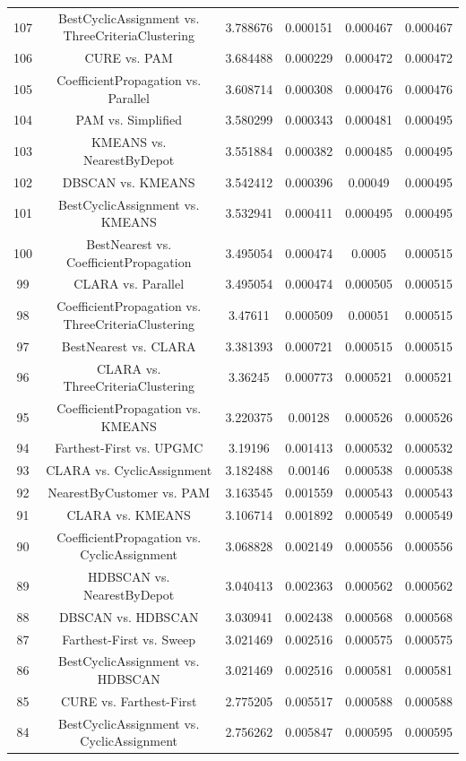 \documentclass[a4paper,10pt]{article}
\begin{document}
\begin{landscape}
\begin{table}[!htp]
\begin{tabular}{cccccc}
107&BestCyclicAssignment vs. ThreeCriteriaClustering&3.788676&0.000151&0.000467&0.000467\\
106&CURE vs. PAM&3.684488&0.000229&0.000472&0.000472\\
105&CoefficientPropagation vs. Parallel&3.608714&0.000308&0.000476&0.000476\\
104&PAM vs. Simplified&3.580299&0.000343&0.000481&0.000495\\
103&KMEANS vs. NearestByDepot&3.551884&0.000382&0.000485&0.000495\\
102&DBSCAN vs. KMEANS&3.542412&0.000396&0.00049&0.000495\\
101&BestCyclicAssignment vs. KMEANS&3.532941&0.000411&0.000495&0.000495\\
100&BestNearest vs. CoefficientPropagation&3.495054&0.000474&0.0005&0.000515\\
99&CLARA vs. Parallel&3.495054&0.000474&0.000505&0.000515\\
98&CoefficientPropagation vs. ThreeCriteriaClustering&3.47611&0.000509&0.00051&0.000515\\
97&BestNearest vs. CLARA&3.381393&0.000721&0.000515&0.000515\\
96&CLARA vs. ThreeCriteriaClustering&3.36245&0.000773&0.000521&0.000521\\
95&CoefficientPropagation vs. KMEANS&3.220375&0.00128&0.000526&0.000526\\
94&Farthest-First vs. UPGMC&3.19196&0.001413&0.000532&0.000532\\
93&CLARA vs. CyclicAssignment&3.182488&0.00146&0.000538&0.000538\\
92&NearestByCustomer vs. PAM&3.163545&0.001559&0.000543&0.000543\\
91&CLARA vs. KMEANS&3.106714&0.001892&0.000549&0.000549\\
90&CoefficientPropagation vs. CyclicAssignment&3.068828&0.002149&0.000556&0.000556\\
89&HDBSCAN vs. NearestByDepot&3.040413&0.002363&0.000562&0.000562\\
88&DBSCAN vs. HDBSCAN&3.030941&0.002438&0.000568&0.000568\\
87&Farthest-First vs. Sweep&3.021469&0.002516&0.000575&0.000575\\
86&BestCyclicAssignment vs. HDBSCAN&3.021469&0.002516&0.000581&0.000581\\
85&CURE vs. Farthest-First&2.775205&0.005517&0.000588&0.000588\\
84&BestCyclicAssignment vs. CyclicAssignment&2.756262&0.005847&0.000595&0.000595\\

\end{tabular}
\end{table}
\end{landscape}
\end{document}
